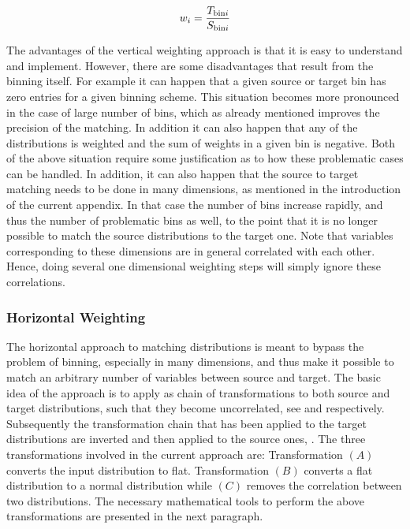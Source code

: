 \begin{equation}
  \centering
  w_i = \frac{T_{{\rm bin}i}}{S_{{\rm bin}i}}
\label{vert_rew}
\end{equation}

The advantages of the vertical weighting approach is that it is easy to understand and implement.
However, there are some disadvantages that result from the binning itself. For example it can happen
that a given source or target bin has zero entries for a given binning scheme. This situation
becomes more pronounced in the case of large number of bins, which as already mentioned improves the
precision of the matching. In addition it can also happen that any of the distributions is weighted and
the sum of weights in a given bin is negative. Both of the above situation require some justification
as to how these problematic cases can be handled. In addition, it can also happen that the source to
target matching needs to be done in many dimensions, as mentioned in the introduction of the current
appendix. In that case the number of bins increase rapidly, and thus the number of problematic bins as well,
to the point that it is no longer possible to match the source distributions to the target one.
Note that variables corresponding to these dimensions are in general correlated with each other.
Hence, doing several one dimensional weighting steps will simply ignore these correlations.

\subsubsection{Horizontal Weighting}
The horizontal approach to matching distributions is meant to bypass the problem of binning, especially in many dimensions,
and thus make it possible to match an arbitrary number of variables between source
and target. The basic idea of the approach is to apply as chain of transformations to both source and target
distributions, such that they become uncorrelated, see  and 
respectively. Subsequently the transformation chain that has been applied to the target distributions
are inverted and then applied to the source ones, . The three transformations
involved in the current approach are: Transformation $(A)$ converts the input distribution to flat.
Transformation $(B)$ converts a flat distribution to a normal distribution while $(C)$ removes
the correlation between two distributions. The necessary mathematical tools to perform the above transformations
are presented in the next paragraph.

